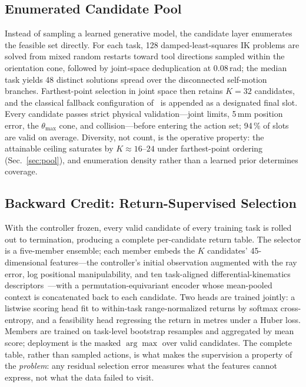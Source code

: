 \documentclass{svproc}
\begin{document}
\subsection{Enumerated Candidate Pool}
\label{sec:method-pool}
Instead of sampling a learned generative model, the candidate layer
enumerates the feasible set directly. For each task, 128 damped-least-squares
IK problems are solved from mixed random restarts toward tool directions
sampled within the orientation cone, followed by joint-space deduplication at
0.08\,rad; the median task yields 48 distinct solutions spread over the
disconnected self-motion branches. Farthest-point selection in joint space
then retains $K{=}32$ candidates, and the classical fallback configuration
of~\cite{yuan2026extreme} is appended as a designated final slot. Every
candidate passes strict physical validation---joint limits, 5\,mm position
error, the $\theta_{\max}$ cone, and collision---before entering the action
set; 94\,\% of slots are valid on average. Diversity, not count, is the
operative property: the attainable ceiling saturates by $K{\approx}16$--$24$
under farthest-point ordering (Sec.~\ref{sec:pool}), and enumeration density
rather than a learned prior determines coverage.

\subsection{Backward Credit: Return-Supervised Selection}
\label{sec:method-selector}
With the controller frozen, every valid candidate of every training task is
rolled out to termination, producing a complete per-candidate return table.
The selector is a five-member ensemble; each member embeds the $K$
candidates' 45-dimensional features---the controller's initial observation
augmented with the ray error, log positional manipulability, and ten
task-aligned differential-kinematics descriptors~\cite{yuan2026extreme}---with
a permutation-equivariant encoder whose mean-pooled context is concatenated
back to each candidate. Two heads are trained jointly: a listwise scoring
head fit to within-task range-normalized returns by softmax cross-entropy,
and a feasibility head regressing the return in metres under a Huber loss.
Members are trained on task-level bootstrap resamples and aggregated by mean
score; deployment is the masked $\arg\max$ over valid candidates. The
complete table, rather than sampled actions, is what makes the supervision a
property of the \textit{problem}: any residual selection error measures what
the features cannot express, not what the data failed to visit.
\end{document}
